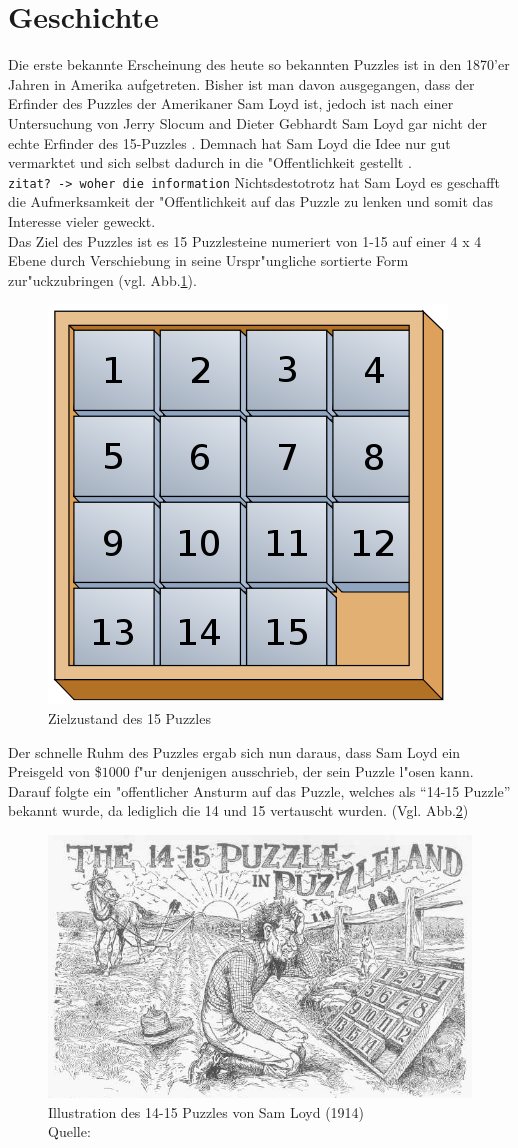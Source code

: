 \section{Geschichte} %
\label{cha:Geschichte}
Die erste bekannte Erscheinung des heute so bekannten Puzzles ist in den 1870'er Jahren in Amerika aufgetreten. Bisher ist man davon ausgegangen, dass der Erfinder des Puzzles der Amerikaner Sam Loyd ist, jedoch ist nach einer Untersuchung von Jerry Slocum and Dieter Gebhardt Sam Loyd gar nicht der echte Erfinder des 15-Puzzles \autocite{anchor-puzzle:book, the-15-puzzle:online}. Demnach hat Sam Loyd die Idee nur gut vermarktet und sich selbst dadurch in die "Offentlichkeit gestellt \autocite{wiki-15-puzzle:online}.\\
\texttt{zitat? -> woher die information}
Nichtsdestotrotz hat Sam Loyd es geschafft die Aufmerksamkeit der "Offentlichkeit auf das Puzzle zu lenken und somit das Interesse vieler geweckt.\\
Das Ziel des Puzzles ist es 15 Puzzlesteine numeriert von 1-15 auf einer 4 x 4 Ebene durch Verschiebung in seine Urspr"ungliche sortierte Form zur"uckzubringen (vgl. Abb.\ref{fig:puzzle-end}).
\begin{figure}[H]
    \centering
    \includegraphics[width=.3\textwidth,keepaspectratio]{img/Fifteen_puzzle.png}
    \captionsetup{format=hang}
    \caption[Zielzustand des 15 Puzzles]{\label{fig:puzzle-end}Zielzustand des 15 Puzzles}
\end{figure}
Der schnelle Ruhm des Puzzles ergab sich nun daraus, dass Sam Loyd ein Preisgeld von \$$1000$ f"ur denjenigen ausschrieb, der sein Puzzle l"osen kann. Darauf folgte ein "offentlicher Ansturm auf das Puzzle, welches als \enquote{14-15 Puzzle} bekannt wurde, da lediglich die 14 und 15 vertauscht wurden. (Vgl. Abb.\ref{fig:puzzle-illustration})
\begin{figure}[H]
    \centering
    \includegraphics[width=.6\textwidth,keepaspectratio]{img/sam-loyd-puzzle-illustration.jpg}
    \captionsetup{format=hang}
    \caption[Illustration des 14-15 Puzzles von Sam Loyd]{\label{fig:puzzle-illustration}Illustration des 14-15 Puzzles von Sam Loyd (1914) \\Quelle: \cite[pp. 234-235]{loyd-cyclopedia:book}}
\end{figure}
